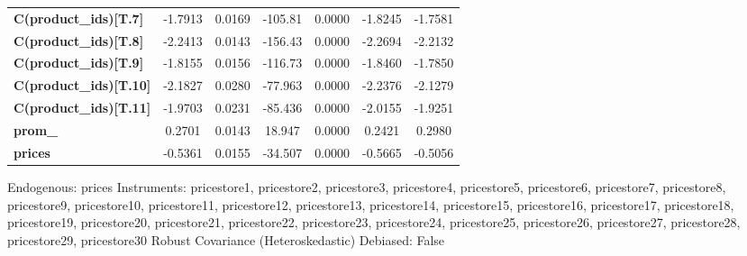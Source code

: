 \begin{center}
\begin{tabular}{lcccccc}
\textbf{C(product\_ids)[T.7]}  &      -1.7913       &       0.0169       &     -105.81     &      0.0000      &      -1.8245      &      -1.7581       \\
\textbf{C(product\_ids)[T.8]}  &      -2.2413       &       0.0143       &     -156.43     &      0.0000      &      -2.2694      &      -2.2132       \\
\textbf{C(product\_ids)[T.9]}  &      -1.8155       &       0.0156       &     -116.73     &      0.0000      &      -1.8460      &      -1.7850       \\
\textbf{C(product\_ids)[T.10]} &      -2.1827       &       0.0280       &     -77.963     &      0.0000      &      -2.2376      &      -2.1279       \\
\textbf{C(product\_ids)[T.11]} &      -1.9703       &       0.0231       &     -85.436     &      0.0000      &      -2.0155      &      -1.9251       \\
\textbf{prom\_}                &       0.2701       &       0.0143       &      18.947     &      0.0000      &       0.2421      &       0.2980       \\
\textbf{prices}                &      -0.5361       &       0.0155       &     -34.507     &      0.0000      &      -0.5665      &      -0.5056       \\
\bottomrule
\end{tabular}
\end{center}

Endogenous: prices \newline
 Instruments: pricestore1, pricestore2, pricestore3, pricestore4, pricestore5, pricestore6, pricestore7, pricestore8, pricestore9, pricestore10, pricestore11, pricestore12, pricestore13, pricestore14, pricestore15, pricestore16, pricestore17, pricestore18, pricestore19, pricestore20, pricestore21, pricestore22, pricestore23, pricestore24, pricestore25, pricestore26, pricestore27, pricestore28, pricestore29, pricestore30 \newline
 Robust Covariance (Heteroskedastic) \newline
 Debiased: False
